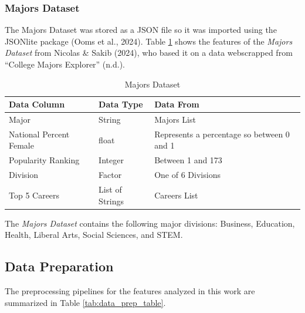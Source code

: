 \documentclass{article}
\begin{document}
\subsubsection{Majors Dataset}\label{majors-dataset}

The Majors Dataset was stored as a JSON file so it was imported using the JSONlite package (Ooms et al., 2024). Table \ref{tab:majors_dataset} shows the features of the \emph{Majors Dataset} from Nicolas \& Sakib (2024), who based it on a data webscrapped from {``College {Majors Explorer}''} (n.d.).

\begin{table}[htbp]
  \centering
  \begin{tabular}{|l|l|l|}
    \hline
    Data Column & Data Type & Data From \\
    \hline
    Major & String & Majors List \\
    \hline
    National Percent Female & float & Represents a percentage so between 0 and 1 \\
    \hline
    Popularity Ranking & Integer & Between 1 and 173 \\
    \hline
    Division & Factor & One of 6 Divisions\\
    \hline
    Top 5 Careers & List of Strings & Careers List\\
    \hline
  \end{tabular}
  \caption{Majors Dataset}
  \label{tab:majors_dataset}
\end{table}

The \emph{Majors Dataset} contains the following major divisions: Business, Education, Health, Liberal Arts, Social Sciences, and STEM.

\subsection{Data Preparation}\label{data-preparation}

\label{sec:data_preparation}

The preprocessing pipelines for the features analyzed in this work are summarized in Table \ref{tab:data_prep_table}.
\end{document}

